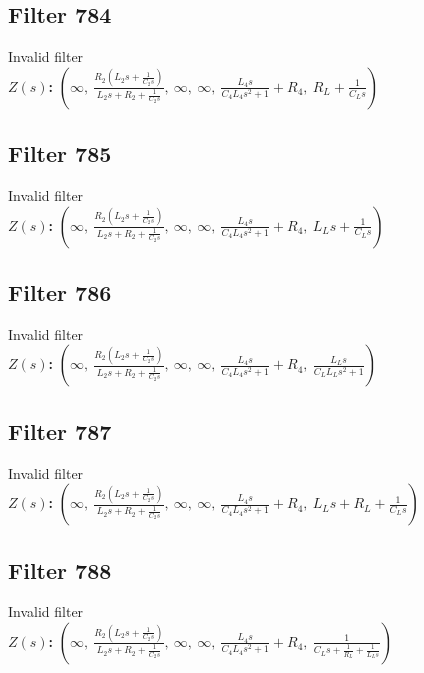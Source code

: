 \documentclass{article}
\begin{document}
\subsection*{Filter 784}
Invalid filter \\ 
\textbf{$Z(s)$:} $\left( \infty, \  \frac{R_{2} \left(L_{2} s + \frac{1}{C_{2} s}\right)}{L_{2} s + R_{2} + \frac{1}{C_{2} s}}, \  \infty, \  \infty, \  \frac{L_{4} s}{C_{4} L_{4} s^{2} + 1} + R_{4}, \  R_{L} + \frac{1}{C_{L} s}\right)$ \\ 
\subsection*{Filter 785}
Invalid filter \\ 
\textbf{$Z(s)$:} $\left( \infty, \  \frac{R_{2} \left(L_{2} s + \frac{1}{C_{2} s}\right)}{L_{2} s + R_{2} + \frac{1}{C_{2} s}}, \  \infty, \  \infty, \  \frac{L_{4} s}{C_{4} L_{4} s^{2} + 1} + R_{4}, \  L_{L} s + \frac{1}{C_{L} s}\right)$ \\ 
\subsection*{Filter 786}
Invalid filter \\ 
\textbf{$Z(s)$:} $\left( \infty, \  \frac{R_{2} \left(L_{2} s + \frac{1}{C_{2} s}\right)}{L_{2} s + R_{2} + \frac{1}{C_{2} s}}, \  \infty, \  \infty, \  \frac{L_{4} s}{C_{4} L_{4} s^{2} + 1} + R_{4}, \  \frac{L_{L} s}{C_{L} L_{L} s^{2} + 1}\right)$ \\ 
\subsection*{Filter 787}
Invalid filter \\ 
\textbf{$Z(s)$:} $\left( \infty, \  \frac{R_{2} \left(L_{2} s + \frac{1}{C_{2} s}\right)}{L_{2} s + R_{2} + \frac{1}{C_{2} s}}, \  \infty, \  \infty, \  \frac{L_{4} s}{C_{4} L_{4} s^{2} + 1} + R_{4}, \  L_{L} s + R_{L} + \frac{1}{C_{L} s}\right)$ \\ 
\subsection*{Filter 788}
Invalid filter \\ 
\textbf{$Z(s)$:} $\left( \infty, \  \frac{R_{2} \left(L_{2} s + \frac{1}{C_{2} s}\right)}{L_{2} s + R_{2} + \frac{1}{C_{2} s}}, \  \infty, \  \infty, \  \frac{L_{4} s}{C_{4} L_{4} s^{2} + 1} + R_{4}, \  \frac{1}{C_{L} s + \frac{1}{R_{L}} + \frac{1}{L_{L} s}}\right)$ \\ 
\end{document}
